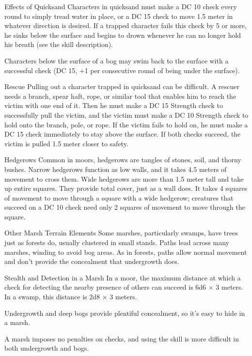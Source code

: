 Effects of Quicksand
Characters in quicksand must make a DC 10  check every round to simply tread water in place, or a DC 15  check to move 1.5 meter in whatever direction is desired. If a trapped character fails this check by 5 or more, he sinks below the surface and begins to drown whenever he can no longer hold his breath (see the  skill description).

Characters below the surface of a bog may swim back to the surface with a successful  check (DC 15, +1 per consecutive round of being under the surface).

Rescue
Pulling out a character trapped in quicksand can be difficult. A rescuer needs a branch, spear haft, rope, or similar tool that enables him to reach the victim with one end of it. Then he must make a DC 15 Strength check to successfully pull the victim, and the victim must make a DC 10 Strength check to hold onto the branch, pole, or rope. If the victim fails to hold on, he must make a DC 15  check immediately to stay above the surface. If both checks succeed, the victim is pulled 1.5 meter closer to safety.

Hedgerows
Common in moors, hedgerows are tangles of stones, soil, and thorny bushes. Narrow hedgerows function as low walls, and it takes 4.5 meters of movement to cross them. Wide hedgerows are more than 1.5 meter tall and take up entire squares. They provide total cover, just as a wall does. It takes 4 squares of movement to move through a square with a wide hedgerow; creatures that succeed on a DC 10  check need only 2 squares of movement to move through the square.

Other Marsh Terrain Elements
Some marshes, particularly swamps, have trees just as forests do, usually clustered in small stands. Paths lead across many marshes, winding to avoid bog areas. As in forests, paths allow normal movement and don’t provide the concealment that undergrowth does.

Stealth and Detection in a Marsh
In a moor, the maximum distance at which a  check for detecting the nearby presence of others can succeed is 6d6 $\times$ 3 meters. In a swamp, this distance is 2d8 $\times$ 3 meters.

Undergrowth and deep bogs provide plentiful concealment, so it’s easy to hide in a marsh.

A marsh imposes no penalties on  checks, and using the  skill is more difficult in both undergrowth and bogs.